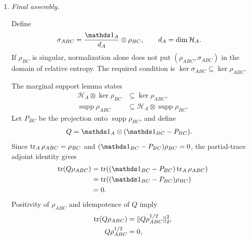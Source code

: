 \documentclass[11pt]{article}
\begin{document}
\begin{enumerate}
    \item \emph{Final assembly.}

    Define
    \begin{align}
        \sigma_{ABC}
            &= \frac{\Id_A}{d_A}\otimes\rho_{BC},
        \qquad d_A=\dim\mathcal H_A.
        \label{eq:cpsv16_ssa_from_lieb_route_reference_state}
    \end{align}
    If $\rho_{BC}$ is singular, normalization alone does not put
    $(\rho_{ABC},\sigma_{ABC})$ in the domain of relative entropy. The required
    condition is $\ker\sigma_{ABC}\subseteq\ker\rho_{ABC}$.

    The marginal support lemma states
    \begin{align}
        \mathcal H_A\otimes\ker\rho_{BC}
            &\subseteq\ker\rho_{ABC},
        \label{eq:cpsv16_ssa_from_lieb_route_marginal_kernel}\\
        \operatorname{supp}\rho_{ABC}
            &\subseteq
            \mathcal H_A\otimes\operatorname{supp}\rho_{BC}.
        \label{eq:cpsv16_ssa_from_lieb_route_marginal_support}
    \end{align}
    Let $P_{BC}$ be the projection onto
    $\operatorname{supp}\rho_{BC}$, and define
    \begin{align}
        Q
            &= \Id_A\otimes(\Id_{BC}-P_{BC}).
        \label{eq:cpsv16_ssa_from_lieb_route_kernel_projection}
    \end{align}
    Since $\operatorname{tr}_A\rho_{ABC}=\rho_{BC}$ and
    $(\Id_{BC}-P_{BC})\rho_{BC}=0$, the partial-trace adjoint identity gives
    \begin{align}
        \tr(Q\rho_{ABC})
            &= \tr((\Id_{BC}-P_{BC})\tr_A\rho_{ABC})
        \label{eq:cpsv16_ssa_from_lieb_route_projection_trace_reduction}\\
            &= \tr((\Id_{BC}-P_{BC})\rho_{BC})
        \label{eq:cpsv16_ssa_from_lieb_route_projection_trace_marginal}\\
            &= 0.
        \label{eq:cpsv16_ssa_from_lieb_route_projection_trace_zero}
    \end{align}
    Positivity of $\rho_{ABC}$ and idempotence of $Q$ imply
    \begin{align}
        \tr(Q\rho_{ABC})
            &= \lVert Q\rho_{ABC}^{1/2}\rVert_2^2,
        \label{eq:cpsv16_ssa_from_lieb_route_projection_hilbert_schmidt}\\
        Q\rho_{ABC}^{1/2}
            &= 0,
        \label{eq:cpsv16_ssa_from_lieb_route_projection_square_root_zero}\\

\end{align}
\end{enumerate}
\end{document}
